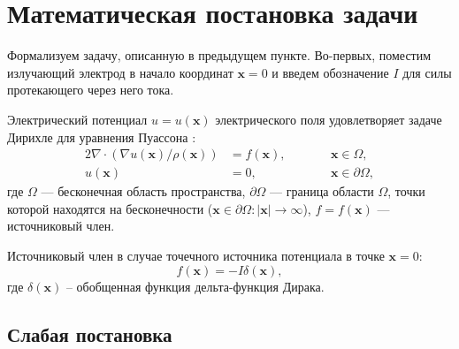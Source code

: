 \let\Omega\varOmega

\section{Математическая постановка задачи}

Формализуем задачу, описанную в предыдущем пункте. Во-первых, поместим излучающий электрод в начало координат ${{\bm x = 0}}$ и введем обозначение ${I}$ для силы протекающего через него тока.




Электрический потенциал ${{u = u(\bm x)}}$ электрического поля удовлетворяет задаче Дирихле для уравнения Пуассона \cite[с. 67]{elec}:
\begin{alignat}{2}
\nabla \cdot (\nabla u(\bm x) / \rho(\bm x)) &= f(\bm x),\qquad && \bm x \in \Omega, \label{eq:poisson}\\
u(\bm x) &= 0, && \bm x \in \partial \Omega, \label{eq:dirichet}
\end{alignat}
где ${\Omega}$ --- бесконечная область пространства, ${{\partial \Omega}}$ --- граница области ${\Omega}$, точки которой находятся на бесконечности (${{\bm x \in \partial \Omega: |\bm x| \rightarrow \infty}}$), ${{f = f(\bm x)}}$ --- источниковый член.

Источниковый член в случае точечного источника потенциала в точке ${{\bm x = 0}}$:
\begin{equation}
f(\bm x) = -I \delta(\bm x),
\end{equation}
где ${\delta(\bm x)}$ -- обобщенная функция дельта-функция Дирака.


\subsection{Слабая постановка}

